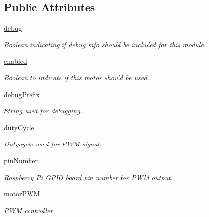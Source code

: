 \subsection*{Public Attributes}
\begin{DoxyCompactItemize}
\item 
\mbox{\label{classmcs_1_1Sabertooth2x60_1_1Sabertooth2x60_a1a8a13f3eb95a45405803e8bb0b90d55}} 
\hyperlink{classmcs_1_1Sabertooth2x60_1_1Sabertooth2x60_a1a8a13f3eb95a45405803e8bb0b90d55}{debug}
\begin{DoxyCompactList}\small\item\em Boolean indicating if debug info should be included for this module. \end{DoxyCompactList}\item 
\hyperlink{classmcs_1_1Sabertooth2x60_1_1Sabertooth2x60_a5841fe4acd53f784c65025697c4c81b6}{enabled}
\begin{DoxyCompactList}\small\item\em Boolean to indicate if this motor should be used. \end{DoxyCompactList}\item 
\mbox{\label{classmcs_1_1Sabertooth2x60_1_1Sabertooth2x60_a76b731be11f7f02329441cac763e7cf6}} 
\hyperlink{classmcs_1_1Sabertooth2x60_1_1Sabertooth2x60_a76b731be11f7f02329441cac763e7cf6}{debug\+Prefix}
\begin{DoxyCompactList}\small\item\em String used for debugging. \end{DoxyCompactList}\item 
\hyperlink{classmcs_1_1Sabertooth2x60_1_1Sabertooth2x60_ab2a2769dcfc3d37e1b9c41592d854792}{duty\+Cycle}
\begin{DoxyCompactList}\small\item\em Dutycycle used for P\+WM signal. \end{DoxyCompactList}\item 
\mbox{\label{classmcs_1_1Sabertooth2x60_1_1Sabertooth2x60_aa9937580058f87d4db9f70d3cd532760}} 
\hyperlink{classmcs_1_1Sabertooth2x60_1_1Sabertooth2x60_aa9937580058f87d4db9f70d3cd532760}{pin\+Number}
\begin{DoxyCompactList}\small\item\em Raspberry Pi G\+P\+IO board pin number for P\+WM output. \end{DoxyCompactList}\item 
\mbox{\label{classmcs_1_1Sabertooth2x60_1_1Sabertooth2x60_a29f8622d8ae224e4a37b612de3f9ab10}} 
\hyperlink{classmcs_1_1Sabertooth2x60_1_1Sabertooth2x60_a29f8622d8ae224e4a37b612de3f9ab10}{motor\+P\+WM}
\begin{DoxyCompactList}\small\item\em P\+WM controller. \end{DoxyCompactList}\end{DoxyCompactItemize}


